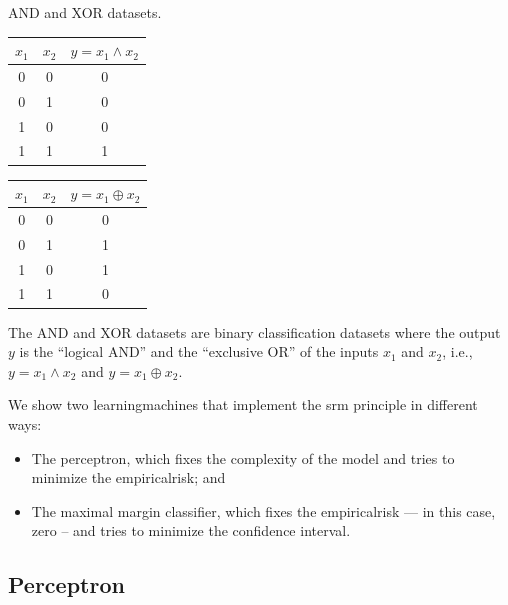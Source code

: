 \begin{tablebox}[label=tab:and-xor]{AND and XOR datasets.}
  \centering
  \begin{minipage}{0.45\textwidth}
    \centering
    \begin{tabular}{ccc}
      \toprule
      $x_1$ & $x_2$ & $y = x_1 \land x_2$ \\
      \midrule
      0 & 0 & 0 \\
      0 & 1 & 0 \\
      1 & 0 & 0 \\
      1 & 1 & 1 \\
      \bottomrule
    \end{tabular}
  \end{minipage}
  \begin{minipage}{0.45\textwidth}
  \centering
  \begin{tabular}{ccc}
    \toprule
    $x_1$ & $x_2$ & $y = x_1 \oplus x_2$ \\
    \midrule
    0 & 0 & 0 \\
    0 & 1 & 1 \\
    1 & 0 & 1 \\
    1 & 1 & 0 \\
    \bottomrule
  \end{tabular}
  \end{minipage}
  \tcblower
  The AND and XOR datasets are binary classification datasets where the output $y$ is the
  ``logical AND'' and the ``exclusive OR'' of the inputs $x_1$ and $x_2$, i.e.,
  $y = x_1 \land x_2$ and $y = x_1 \oplus x_2$.
\end{tablebox}

We show two \glspl{learningmachine} that implement the \gls{srm} principle in different ways:
\begin{itemize}
  \itemsep0em
  \item The perceptron, which fixes the complexity of the model and tries to minimize the
    \gls{empiricalrisk}; and
  \item The maximal margin classifier, which fixes the \gls{empiricalrisk} --- in this case,
    zero -- and tries to minimize the confidence interval.
\end{itemize}

\subsection{Perceptron}
\label{sub:perceptron}

